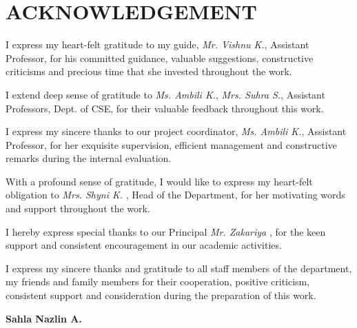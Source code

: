 \chapter*{ACKNOWLEDGEMENT}

\begin{acknowledgements}
\newcommand{\tab}{\hspace*{2em}}

\hspace{0.75cm} I express my heart-felt gratitude to  my guide, \emph{Mr. Vishnu K.}, Assistant Professor, for his committed guidance, valuable suggestions, constructive criticisms and precious time that she invested throughout the work. %

I extend deep sense of gratitude to  \emph{Ms. Ambili K.}, \emph{Mrs. Suhra S.}, Assistant Professors, Dept. of CSE, for their valuable feedback  throughout this work.


I express my sincere thanks to our project coordinator, \emph{Ms. Ambili K.}, Assistant Professor, for her exquisite supervision, efficient management and constructive remarks during the internal evaluation.


With a profound sense of gratitude, I would like to express my heart-felt obligation to \emph{Mrs. Shyni K. }, Head of the Department, for her motivating words and support throughout the work.

I hereby express special thanks to our Principal \emph{Mr. Zakariya }, for the keen support and consistent encouragement in our academic activities. 

I express my sincere thanks and gratitude to all staff members of the department, my friends and family members for their cooperation, positive criticism, consistent support and consideration during the preparation of this work.

\vspace *{2 cm}
\begin{raggedright}
\vspace*{5mm}
\hspace*{112mm}
\textbf{Sahla Nazlin A.}
\end{raggedright}



\end{acknowledgements}
